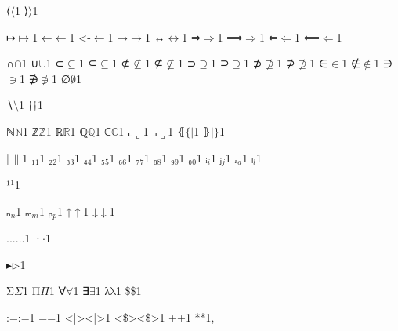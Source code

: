 {%
{⟨}{{\ensuremath{\langle}}}1
{⟩}{{\ensuremath{\rangle}}}1

{↦}{{\ensuremath{\mapsto}}}1
{←}{{\ensuremath{\leftarrow}}}1
{<-}{{\ensuremath{\leftarrow}}}1
{→}{{\ensuremath{\rightarrow}}}1
{↔}{{\ensuremath{\leftrightarrow}}}1
{⇒}{{\ensuremath{\Rightarrow}}}1
{⟹}{{\ensuremath{\Longrightarrow}}}1
{⇐}{{\ensuremath{\Leftarrow}}}1
{⟸}{{\ensuremath{\Longleftarrow}}}1

{∩}{{\ensuremath{\cap}}}1
{∪}{{\ensuremath{\cup}}}1
{⊂}{{\ensuremath{\subseteq}}}1
{⊆}{{\ensuremath{\subseteq}}}1
{⊄}{{\ensuremath{\nsubseteq}}}1
{⊈}{{\ensuremath{\nsubseteq}}}1
{⊃}{{\ensuremath{\supseteq}}}1
{⊇}{{\ensuremath{\supseteq}}}1
{⊅}{{\ensuremath{\nsupseteq}}}1
{⊉}{{\ensuremath{\nsupseteq}}}1
{∈}{{\ensuremath{\in}}}1
{∉}{{\ensuremath{\notin}}}1
{∋}{{\ensuremath{\ni}}}1
{∌}{{\ensuremath{\notni}}}1
{∅}{{\ensuremath{\emptyset}}}1

{∖}{{\ensuremath{\setminus}}}1
{†}{{\ensuremath{\dag}}}1

{ℕ}{{\ensuremath{\mathbb{N}}}}1
{ℤ}{{\ensuremath{\mathbb{Z}}}}1
{ℝ}{{\ensuremath{\mathbb{R}}}}1
{ℚ}{{\ensuremath{\mathbb{Q}}}}1
{ℂ}{{\ensuremath{\mathbb{C}}}}1
{⌞}{{\ensuremath{\llcorner}}}1
{⌟}{{\ensuremath{\lrcorner}}}1
{⦃}{{\ensuremath{\{\!|}}}1
{⦄}{{\ensuremath{|\!\}}}}1

{‖}{{\ensuremath{\|}}}1
{₁}{{\ensuremath{_1}}}1
{₂}{{\ensuremath{_2}}}1
{₃}{{\ensuremath{_3}}}1
{₄}{{\ensuremath{_4}}}1
{₅}{{\ensuremath{_5}}}1
{₆}{{\ensuremath{_6}}}1
{₇}{{\ensuremath{_7}}}1
{₈}{{\ensuremath{_8}}}1
{₉}{{\ensuremath{_9}}}1
{₀}{{\ensuremath{_0}}}1
{ᵢ}{{\ensuremath{_i}}}1
{ⱼ}{{\ensuremath{_j}}}1
{ₐ}{{\ensuremath{_a}}}1
{ₗ}{{\ensuremath{_l}}}1

{¹}{{\ensuremath{^1}}}1

{ₙ}{{\ensuremath{_n}}}1
{ₘ}{{\ensuremath{_m}}}1
{ₚ}{{\ensuremath{_p}}}1
{↑}{{\ensuremath{\uparrow}}}1
{↓}{{\ensuremath{\downarrow}}}1

{...}{{\ensuremath{\ldots}}}1
{·}{{\ensuremath{\cdot}}}1

{▸}{{\ensuremath{\triangleright}}}1

{Σ}{{\color{symbolcolor}\ensuremath{\Sigma}}}1
{Π}{{\color{symbolcolor}\ensuremath{\Pi}}}1
{∀}{{\color{symbolcolor}\ensuremath{\forall}}}1
{∃}{{\color{symbolcolor}\ensuremath{\exists}}}1
{λ}{{\color{symbolcolor}\ensuremath{\mathrm{\lambda}}}}1
{\$}{{\color{symbolcolor}\$}}1

{:=}{{\color{symbolcolor}:=}}1
{=}{{\color{symbolcolor}=}}1
{<|>}{{\color{symbolcolor}<|>}}1
{<\$>}{{\color{symbolcolor}<\$>}}1
{+}{{\color{symbolcolor}+}}1
{*}{{\color{symbolcolor}*}}1,

}
